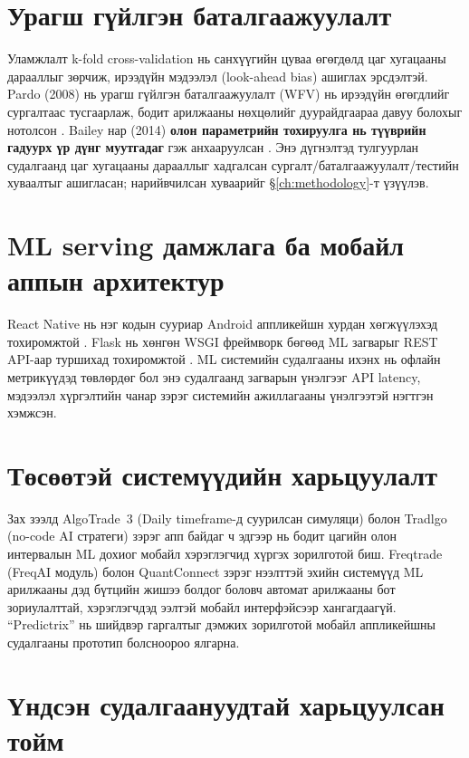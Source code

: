 \section{Урагш гүйлгэн баталгаажуулалт}

Уламжлалт k-fold cross-validation нь санхүүгийн цуваа өгөгдөлд цаг хугацааны дарааллыг зөрчиж, ирээдүйн мэдээлэл (look-ahead bias) ашиглах эрсдэлтэй. Pardo (2008) нь урагш гүйлгэн баталгаажуулалт (WFV) нь ирээдүйн өгөгдлийг сургалтаас тусгаарлаж, бодит арилжааны нөхцөлийг дуурайдгаараа давуу болохыг нотолсон \cite{pardo2008evaluation}. Bailey нар (2014) \textbf{олон параметрийн тохируулга нь түүврийн гадуурх үр дүнг муутгадаг} гэж анхааруулсан \cite{bailey2014probability}. Энэ дүгнэлтэд тулгуурлан судалгаанд цаг хугацааны дарааллыг хадгалсан сургалт/баталгаажуулалт/тестийн хуваалтыг ашигласан; нарийвчилсан хуваарийг §\ref{ch:methodology}-т үзүүлэв.

\section{ML serving дамжлага ба мобайл аппын архитектур}

React Native \cite{reactnative} нь нэг кодын сууриар Android аппликейшн хурдан хөгжүүлэхэд тохиромжтой \cite{eisenman2018react}. Flask нь хөнгөн WSGI фреймворк бөгөөд ML загварыг REST API-аар туршихад тохиромжтой \cite{grinberg2018flask}. ML системийн судалгааны ихэнх нь офлайн метрикүүдэд төвлөрдөг бол энэ судалгаанд загварын үнэлгээг API latency, мэдээлэл хүргэлтийн чанар зэрэг системийн ажиллагааны үнэлгээтэй нэгтгэн хэмжсэн.

\section{Төсөөтэй системүүдийн харьцуулалт}

Зах зээлд AlgoTrade~3 (Daily timeframe-д суурилсан симуляци) болон Tradlgo (no-code AI стратеги) зэрэг апп байдаг ч эдгээр нь бодит цагийн олон интервалын ML дохиог мобайл хэрэглэгчид хүргэх зорилготой биш. Freqtrade (FreqAI модуль) болон QuantConnect зэрэг нээлттэй эхийн системүүд ML арилжааны дэд бүтцийн жишээ болдог боловч автомат арилжааны бот зориулалттай, хэрэглэгчдэд ээлтэй мобайл интерфэйсээр хангагдаагүй. ``Predictrix'' нь шийдвэр гаргалтыг дэмжих зорилготой мобайл аппликейшны судалгааны прототип болсноороо ялгарна.

\section{Үндсэн судалгаануудтай харьцуулсан тойм}

